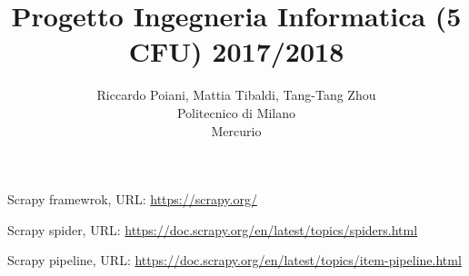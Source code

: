 \documentclass[a4paper]{article}
\begin{document}
\title{Progetto Ingegneria Informatica (5 CFU) 2017/2018}
\author{
        Riccardo Poiani, Mattia Tibaldi, Tang-Tang Zhou \\
        Politecnico di Milano\\  
        Mercurio              
}
\maketitle
\newpage
\tableofcontents
{}
\newpage




\clearpage
\begin{thebibliography}{9}
Scrapy framewrok, URL: \url{https://scrapy.org/}

Scrapy spider, URL: \url{https://doc.scrapy.org/en/latest/topics/spiders.html}

Scrapy pipeline, URL: \url{https://doc.scrapy.org/en/latest/topics/item-pipeline.html}

\end{thebibliography}
\end{document}
